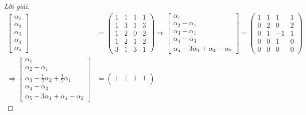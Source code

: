 \documentclass[class=linearalgebra,crop=false]{standalone}
\begin{document}
\begin{proof}[Lời giải]
    \begin{align*}
        \begin{bmatrix}
            \alpha_{1} \\
            \alpha_{2} \\
            \alpha_{3} \\
            \alpha_{4} \\
            \alpha_{5}
        \end{bmatrix}&=
        \begin{pmatrix}
            1 & 1 & 1 & 1 \\
            1 & 3 & 1 & 3 \\
            1 & 2 & 0 & 2 \\
            1 & 2 & 1 & 2 \\
            3 & 1 & 3 & 1
        \end{pmatrix}
        \Longrightarrow
        \begin{bmatrix}
            \alpha_{1} \\
            \alpha_{2}-\alpha_{1} \\
            \alpha_{3}-\alpha_{1} \\
            \alpha_{4}-\alpha_{3} \\
            \alpha_{5}-3\alpha_{1}+\alpha_{4}-\alpha_{2}
        \end{bmatrix}=
        \begin{pmatrix}
            1 & 1 & 1 & 1 \\
            0 & 2 & 0 & 2 \\
            0 & 1 & -1 & 1 \\
            0 & 0 & 1 & 0 \\
            0 & 0 & 0 & 0
        \end{pmatrix} \\
        \Longrightarrow
        \begin{bmatrix}
            \alpha_{1} \\
            \alpha_{2}-\alpha_{1} \\
            \alpha_{3}-\frac{1}{2}\alpha_{2}+\frac{1}{2}\alpha_{1} \\
            \alpha_{4} - \alpha_{3} \\
            \alpha_{5} - 3\alpha_{1} + \alpha_{4} - \alpha_{2}
        \end{bmatrix}&=
        \begin{pmatrix}
            1 & 1 & 1 & 1 \\

\end{pmatrix}
\end{align*}
\end{proof}
\end{document}
